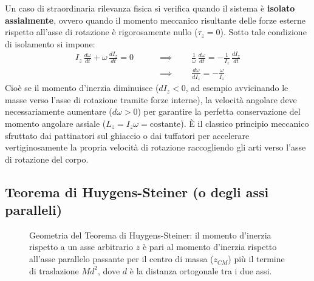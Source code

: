 Un caso di straordinaria rilevanza fisica si verifica quando il sistema è \textbf{isolato assialmente}, ovvero quando il momento meccanico risultante delle forze esterne rispetto all'asse di rotazione è rigorosamente nullo ($\tau_z = 0$). Sotto tale condizione di isolamento si impone:
\begin{align*}
    I_z \, \frac{d\omega}{dt} + \omega \, \frac{dI_z}{dt} = 0 \qquad &\implies \qquad \frac{1}{\omega} \, \frac{d\omega}{dt} = - \frac{1}{I_z} \, \frac{dI_z}{dt} \\
    &\implies \qquad \frac{d\omega}{dI_z} = - \frac{\omega}{I_z}
\end{align*}
Cioè se il momento d'inerzia diminuisce ($dI_z < 0$, ad esempio avvicinando le masse verso l'asse di rotazione tramite forze interne), la velocità angolare deve necessariamente aumentare ($d\omega > 0$) per garantire la perfetta conservazione del momento angolare assiale ($L_z = I_z \omega = \text{costante}$). È il classico principio meccanico sfruttato dai pattinatori sul ghiaccio o dai tuffatori per accelerare vertiginosamente la propria velocità di rotazione raccogliendo gli arti verso l'asse di rotazione del corpo.

\subsection{Teorema di Huygens-Steiner (o degli assi paralleli)}

\begin{figure}[ht]
\centering
{}
\caption{Geometria del Teorema di Huygens-Steiner: il momento d'inerzia rispetto a un asse arbitrario $z$ è pari al momento d'inerzia rispetto all'asse parallelo passante per il centro di massa ($z_{CM}$) più il termine di traslazione $M d^2$, dove $d$ è la distanza ortogonale tra i due assi.}
\end{figure}

